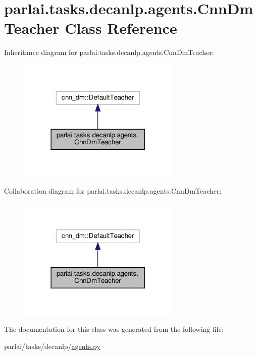 \hypertarget{classparlai_1_1tasks_1_1decanlp_1_1agents_1_1CnnDmTeacher}{}\section{parlai.\+tasks.\+decanlp.\+agents.\+Cnn\+Dm\+Teacher Class Reference}
\label{classparlai_1_1tasks_1_1decanlp_1_1agents_1_1CnnDmTeacher}


Inheritance diagram for parlai.\+tasks.\+decanlp.\+agents.\+Cnn\+Dm\+Teacher\+:
\nopagebreak
\begin{figure}[H]
\begin{center}
\leavevmode
\includegraphics[width=219pt]{classparlai_1_1tasks_1_1decanlp_1_1agents_1_1CnnDmTeacher__inherit__graph}
\end{center}
\end{figure}


Collaboration diagram for parlai.\+tasks.\+decanlp.\+agents.\+Cnn\+Dm\+Teacher\+:
\nopagebreak
\begin{figure}[H]
\begin{center}
\leavevmode
\includegraphics[width=219pt]{classparlai_1_1tasks_1_1decanlp_1_1agents_1_1CnnDmTeacher__coll__graph}
\end{center}
\end{figure}


The documentation for this class was generated from the following file\+:\begin{DoxyCompactItemize}
\item 
parlai/tasks/decanlp/\hyperlink{parlai_2tasks_2decanlp_2agents_8py}{agents.\+py}\end{DoxyCompactItemize}
